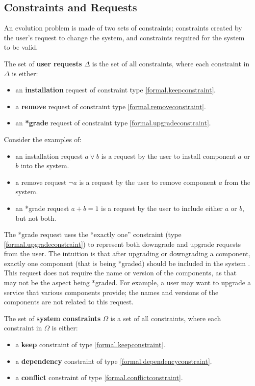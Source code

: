 \subsection{Constraints and Requests}
\label{formal.constraints}
An evolution problem is made of two sets of constraints; constraints created by the user's request to change the system, 
and constraints required for the system to be valid.

\begin{defs}
The set of \textbf{user requests} $\Delta$ is the set of all constraints, where each constraint in $\Delta$ is either:
\begin{itemize}
  \item an \textbf{installation} request of constraint type \ref{formal.keepconstraint}.
  \item a \textbf{remove} request of constraint type \ref{formal.removeconstraint}.
  \item an \textbf{*grade} request of constraint type \ref{formal.upgradeconstraint}.
\end{itemize}
\end{defs}

Consider the examples of:
\begin{itemize}
  \item an installation request $a \vee b$ is a request by the user to install component $a$ or $b$ into the system.
  \item a remove request $\neg a$ is a request by the user to remove component $a$ from the system.
  \item an *grade request $a + b = 1$ is a request by the user to include either $a$ or $b$, but not both.
\end{itemize} 

The *grade request uses the ``exactly one'' constraint (type \ref{formal.upgradeconstraint}) to represent both downgrade and upgrade requests from the user.
The intuition is that after upgrading or downgrading a component, exactly one component (that is being *graded) should be included in the system \citep{treinen2009common}.
This request does not require the name or version of the components, as that may not be the aspect being *graded.
For example, a user may want to upgrade a service that various components provide; the names and versions of the components are not related to this request.

\begin{defs}
The set of \textbf{system constraints} $\Omega$ is a set of all constraints, where each constraint in $\Omega$ is either: 
\begin{itemize}
  \item a \textbf{keep} constraint of type \ref{formal.keepconstraint}.
  \item a \textbf{dependency} constraint of type \ref{formal.dependencyconstraint}.
  \item a \textbf{conflict} constraint of type \ref{formal.conflictconstraint}.
\end{itemize}
\end{defs}

